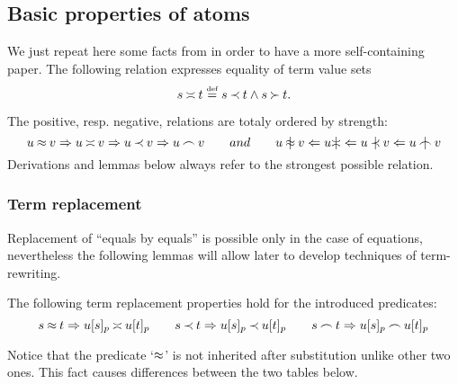 \subsection{Basic properties of atoms}

We just repeat here some facts from \cite {KW} in order to have a more
self-containing paper.  
The following relation expresses equality of term
value sets
\begin{equation} \label{eq:Seteq-definition}
s\mathbin{\asymp} t\mathrel {\stackrel {\mbox {\tiny def}}{=}} s\mathbin{\prec} t\land s\mathbin{\succ} t.
\end{equation}
%

The positive, resp. negative, relations are totaly ordered by strength:
\begin{equation} \label{eq:rel-order}
u\Eq v  \impl u\Seteq v \impl u\Incl v \impl u\Int v
\hspace{2em} and \hspace{2em}
 u\notEq v \Leftarrow u \notSeteq \Leftarrow
 u\notIncl v \Leftarrow u\notInt v 
\end{equation}
Derivations and lemmas below always refer to the strongest possible relation.

\subsubsection{Term replacement}

Replacement
of ``equals by equals'' is possible only in the case of equations, nevertheless
the following lemmas will allow later to develop techniques of term-rewriting.

\begin{lemma}[Replacement] \label{le:replacement}
The following term replacement properties hold for the introduced predicates:
\[
s\Eq t  \impl   u[s]_p \Seteq  u[t]_p\ \ \ \ \ \ 
s\Incl t  \impl  u[s]_p \Incl  u[t]_p\ \ \ \ \ \  
s\Int t \impl  u[s]_p \Int  u[t]_p  \]
\end{lemma}
%
Notice that the predicate `$\mathbin{\approx}$' is not inherited after substitution
unlike other two ones.  This fact causes differences between the two tables
below.

